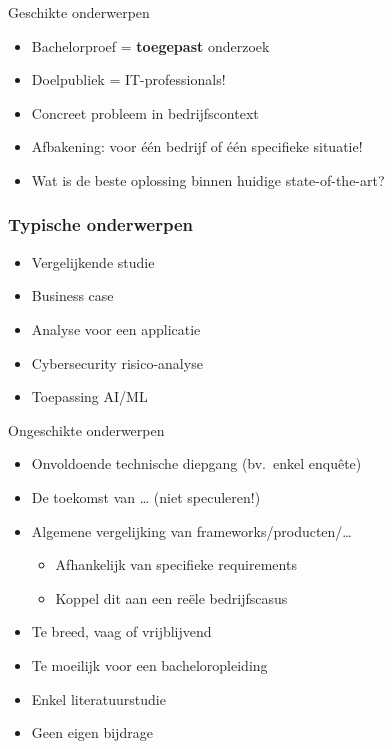 \documentclass[aspectratio=169]{beamer}
\begin{document}
\begin{frame}{Geschikte onderwerpen}

  \begin{itemize}
    \item Bachelorproef = \textbf{toegepast} onderzoek
    \item Doelpubliek = IT-professionals!
    \item Concreet probleem in bedrijfscontext
    \item Afbakening: voor één bedrijf of één specifieke situatie!
    \item Wat is de beste oplossing binnen huidige state-of-the-art?
  \end{itemize}

  \bigskip


\end{frame}

\begin{frame}
  \frametitle{Typische onderwerpen}

  \begin{itemize}
    \item Vergelijkende studie
    \item Business case
    \item Analyse voor een applicatie
    \item Cybersecurity risico-analyse
    \item Toepassing AI/ML
  \end{itemize}

  \bigskip

\end{frame}

\begin{frame}{Ongeschikte onderwerpen}

  \begin{itemize}
    \item Onvoldoende technische diepgang (bv.\ enkel enquête)
    \item De toekomst van \ldots{} (niet speculeren!)
    \item Algemene vergelijking van frameworks/producten/\ldots
          \begin{itemize}
            \item Afhankelijk van specifieke requirements
            \item Koppel dit aan een reële bedrijfscasus
          \end{itemize}
    \item Te breed, vaag of vrijblijvend
    \item Te moeilijk voor een bacheloropleiding
    \item Enkel literatuurstudie
    \item Geen eigen bijdrage
  \end{itemize}

\end{frame}
\end{document}

